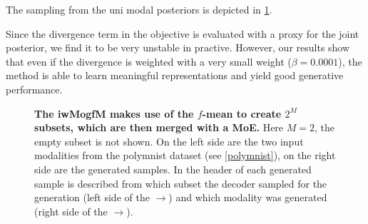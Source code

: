 The sampling from the uni modal posteriors is depicted in \cref{iwmogfmGraph}.

\smallskip

Since the divergence term in the objective is evaluated with a proxy for the joint posterior, we find it to be very unstable in practive.
However, our results show that even if the divergence is weighted with a very small weight ($\beta = 0.0001$), the  method is able to learn meaningful representations and yield good generative performance.

\begin{figure}[h!]
    \centering
    \caption{\textbf{The iwMogfM makes use of the $f$-mean to create $2^M$ subsets, which are then merged with a MoE.} Here $M=2$, the empty subset is not shown. On the left side are the two input modalities from the polymnist dataset (see \cref{polymnist}), on the right side are the generated samples. In the header of each generated sample is described from which subset the decoder sampled for the generation (left side of the $\rightarrow$) and which modality was generated (right side of the $\rightarrow$).}
    \label{iwmogfmGraph}
\end{figure}



